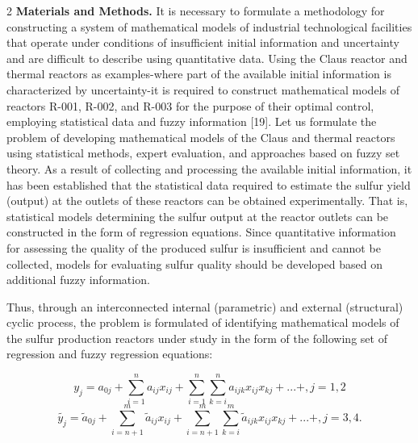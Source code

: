 \begin{multicols}{2}
{\bfseries Materials and Methods.} It is necessary to formulate a
methodology for constructing a system of mathematical models of
industrial technological facilities that operate under conditions of
insufficient initial information and uncertainty and are difficult to
describe using quantitative data. Using the Claus reactor and thermal
reactors as examples-where part of the available initial information is
characterized by uncertainty-it is required to construct mathematical
models of reactors R-001, R-002, and R-003 for the purpose of their
optimal control, employing statistical data and fuzzy information
{[}19{]}. Let us formulate the problem of developing mathematical models
of the Claus and thermal reactors using statistical methods, expert
evaluation, and approaches based on fuzzy set theory. As a result of
collecting and processing the available initial information, it has been
established that the statistical data required to estimate the sulfur
yield (output) at the outlets of these reactors can be obtained
experimentally. That is, statistical models determining the sulfur
output at the reactor outlets can be constructed in the form of
regression equations. Since quantitative information for assessing the
quality of the produced sulfur is insufficient and cannot be collected,
models for evaluating sulfur quality should be developed based on
additional fuzzy information.

Thus, through an interconnected internal (parametric) and external
(structural) cyclic process, the problem is formulated of identifying
mathematical models of the sulfur production reactors under study in the
form of the following set of regression and fuzzy regression equations:
\end{multicols}
\vspace{-1em}
\[y_{j} = a_{0j} + \sum_{i = 1}^{n}{a_{ij}x_{ij}} + \sum_{i = 1}^{n}{\sum_{k = i}^{n}{a_{ijk}x_{ij}x_{kj}} + ... + ,j = 1,2}\]
\[\widetilde{y_{j}} = {\widetilde{a}}_{0j} + \sum_{i = n + 1}^{m}{{\widetilde{a}}_{ij}x_{ij}} + \sum_{i = n + 1}^{m}{\sum_{k = i}^{m}{{\widetilde{a}}_{ijk}x_{ij}x_{kj}} + ... + ,j = 3,4}.\]

